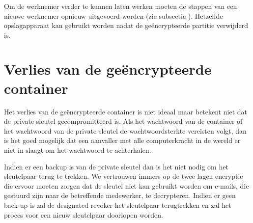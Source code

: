 Om de werknemer verder te kunnen laten werken moeten de stappen van een nieuwe
werknemer opnieuw uitgevoerd worden (zie subsectie
). Hetzelfde opslagapparaat kan
gebruikt worden nadat de geëncrypteerde partitie verwijderd is.

\section{Verlies van de geëncrypteerde container}
\label{sec:verlies-geencrypteerde-container}

Het verlies van de geëncrypteerde container is niet ideaal maar betekent niet
dat de private sleutel gecompromitteerd is. Als het wachtwoord van de container
of het wachtwoord van de private sleutel de wachtwoordsterkte vereisten volgt,
dan is het goed mogelijk dat een aanvaller met alle computerkracht in de wereld
er niet in slaagt om het wachtwoord te achterhalen.

Indien er een backup is van de private sleutel dan is het niet nodig om het
sleutelpaar terug te trekken. We vertrouwen immers op de twee lagen encryptie
die ervoor moeten zorgen dat de sleutel niet kan gebruikt worden om e-mails, die
gestuurd zijn naar de betreffende medewerker, te decrypteren. Indien er geen
back-up is zal de designated revoker het sleutelpaar terugtrekken en zal het
proces voor een nieuw sleutelpaar doorlopen worden.
